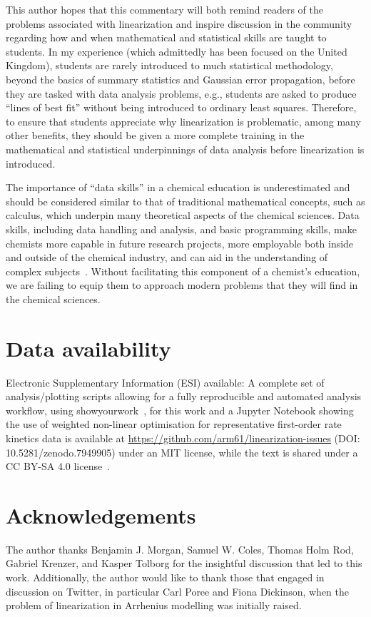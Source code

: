 \documentclass[journal=jceda8,manuscript=article]{achemso}
\begin{document}
This author hopes that this commentary will both remind readers of the problems associated with linearization and inspire discussion in the community regarding how and when mathematical and statistical skills are taught to students. 
In my experience (which admittedly has been focused on the United Kingdom), students are rarely introduced to much statistical methodology, beyond the basics of summary statistics and Gaussian error propagation, before they are tasked with data analysis problems, e.g., students are asked to produce ``lines of best fit'' without being introduced to ordinary least squares.
Therefore, to ensure that students appreciate why linearization is problematic, among many other benefits, they should be given a more complete training in the mathematical and statistical underpinnings of data analysis before linearization is introduced.

The importance of ``data skills'' in a chemical education is underestimated and should be considered similar to that of traditional mathematical concepts, such as calculus, which underpin many theoretical aspects of the chemical sciences.
Data skills, including data handling and analysis, and basic programming skills, make chemists more capable in future research projects, more employable both inside and outside of the chemical industry, and can aid in the understanding of complex subjects~\cite{srnec_python_2017,chng_building_2020,dicksonkarn_implementation_2021,cumby_course_2023}.
Without facilitating this component of a chemist's education, we are failing to equip them to approach modern problems that they will find in the chemical sciences. 

\section*{Data availability}

Electronic Supplementary Information (ESI) available: A complete set of analysis/plotting scripts allowing for a fully reproducible and automated analysis workflow, using showyourwork~\cite{luger_showyourwork_2021}, for this work and a Jupyter Notebook showing the use of weighted non-linear optimisation for representative first-order rate kinetics data is available at \url{https://github.com/arm61/linearization-issues} (DOI: 10.5281/zenodo.7949905) under an MIT license, while the text is shared under a CC BY-SA 4.0 license~\cite{mccluskey_github_2023}.

\section*{Acknowledgements}

The author thanks Benjamin J. Morgan, Samuel W. Coles, Thomas Holm Rod, Gabriel Krenzer, and Kasper Tolborg for the insightful discussion that led to this work. 
Additionally, the author would like to thank those that engaged in discussion on Twitter, in particular Carl Poree and Fiona Dickinson, when the problem of linearization in Arrhenius modelling was initially raised. 


\end{document}
